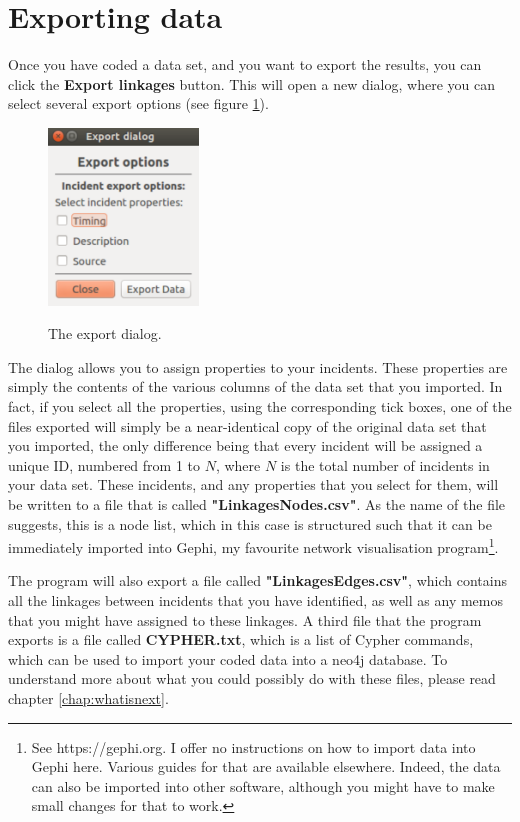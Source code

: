 \documentclass{memoir}
\begin{document}
\section{Exporting data}
\label{sec:exportingdata}

Once you have coded a data set, and you want to export the results, you can click the \textbf{Export linkages} button. This will open a new dialog, where you can select several export options (see figure \ref{fig:exportdialog}).

\begin{figure}[h!]
  \centering
  \caption{The export dialog.}
  \includegraphics[width=40mm]{Screenshot_12.pdf}
  \label{fig:exportdialog}
\end{figure}

The dialog allows you to assign properties to your incidents. These properties are simply the contents of the various columns of the data set that you imported. In fact, if you select all the properties, using the corresponding tick boxes, one of the files exported will simply be a near-identical copy of the original data set that you imported, the only difference being that every incident will be assigned a unique ID, numbered from 1 to \(N\), where \(N\) is the total number of incidents in your data set. These incidents, and any properties that you select for them, will be written to a file that is called \textbf{"Linkages\textunderscore Nodes.csv"}. As the name of the file suggests, this is a node list, which in this case is structured such that it can be immediately imported into Gephi, my favourite network visualisation program\footnote{See https://gephi.org. I offer no instructions on how to import data into Gephi here. Various guides for that are available elsewhere. Indeed, the data can also be imported into other software, although you might have to make small changes for that to work.}. 

The program will also export a file called \textbf{"Linkages\textunderscore Edges.csv"}, which contains all the linkages between incidents that you have identified, as well as any memos that you might have assigned to these linkages. A third file that the program exports is a file called \textbf{CYPHER.txt}, which is a list of Cypher commands, which can be used to import your coded data into a neo4j database. To understand more about what you could possibly do with these files, please read chapter \ref{chap:whatisnext}.
\end{document}

